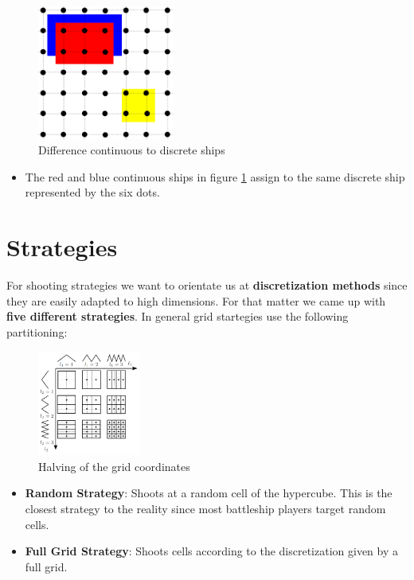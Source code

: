 \documentclass[final,hyperref={pdfpagelabels=false},table]{beamer}
\begin{document}
\begin{frame}
\begin{columns}[T]
\begin{column}{\colCWidth}
\begin{figure}[h]
	\centering
	\includegraphics[width=0.4\textwidth]{../gfx/Ships01.png}
	\caption{Difference continuous to discrete ships}
	\label{fig:ships01}
\end{figure}

\begin{itemize}
	\item The red and blue continuous ships in figure \ref{fig:ships01} assign to the same discrete ship represented by the six dots.
\end{itemize}

\section{Strategies}
For shooting strategies we want to orientate us at \textbf{discretization methods} since they are easily adapted to high dimensions. For that matter we came up with \textbf{five different strategies}. In general grid startegies use the following partitioning:
\begin{figure}[h]
	\centering
	\includegraphics[width=0.3\textwidth]{../gfx/Grids03.png}
	\caption{Halving of the grid coordinates}
\end{figure}
\begin{itemize}
\item \textbf{Random Strategy}: Shoots at a random cell of the hypercube. This is the closest strategy to the reality since most battleship players target random cells.
\item \textbf{Full Grid Strategy}: Shoots cells according to the discretization given by a full grid.
\end{itemize}




\end{column}
\end{columns}
\end{frame}
\end{document}
